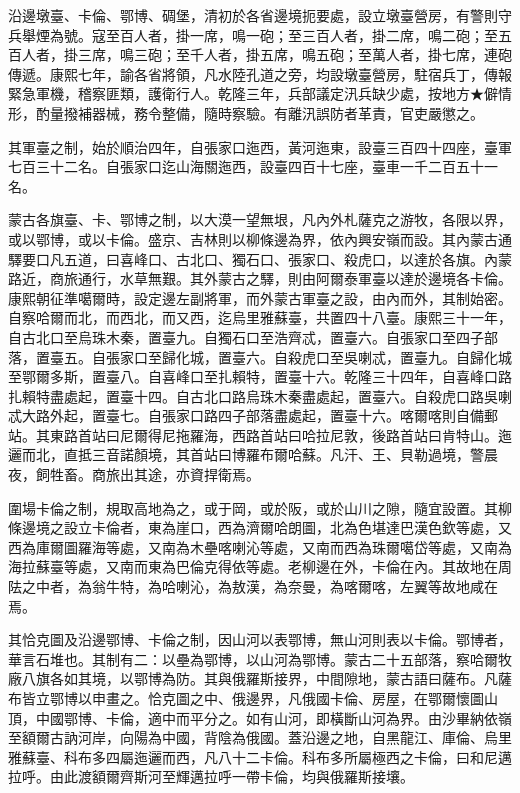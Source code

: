 \begin{pinyinscope}
沿邊墩臺、卡倫、鄂博、碉堡，清初於各省邊境扼要處，設立墩臺營房，有警則守兵舉煙為號。寇至百人者，掛一席，鳴一砲；至三百人者，掛二席，鳴二砲；至五百人者，掛三席，鳴三砲；至千人者，掛五席，鳴五砲；至萬人者，掛七席，連砲傳遞。康熙七年，諭各省將領，凡水陸孔道之旁，均設墩臺營房，駐宿兵丁，傳報緊急軍機，稽察匪類，護衛行人。乾隆三年，兵部議定汛兵缺少處，按地方★僻情形，酌量撥補器械，務令整備，隨時察驗。有離汛誤防者革責，官吏嚴懲之。

其軍臺之制，始於順治四年，自張家口迤西，黃河迤東，設臺三百四十四座，臺軍七百三十二名。自張家口迄山海關迤西，設臺四百十七座，臺車一千二百五十一名。

蒙古各旗臺、卡、鄂博之制，以大漠一望無垠，凡內外札薩克之游牧，各限以界，或以鄂博，或以卡倫。盛京、吉林則以柳條邊為界，依內興安嶺而設。其內蒙古通驛要口凡五道，曰喜峰口、古北口、獨石口、張家口、殺虎口，以達於各旗。內蒙路近，商旅通行，水草無艱。其外蒙古之驛，則由阿爾泰軍臺以達於邊境各卡倫。康熙朝征準噶爾時，設定邊左副將軍，而外蒙古軍臺之設，由內而外，其制始密。自察哈爾而北，而西北，而又西，迄烏里雅蘇臺，共置四十八臺。康熙三十一年，自古北口至烏珠木秦，置臺九。自獨石口至浩齊忒，置臺六。自張家口至四子部落，置臺五。自張家口至歸化城，置臺六。自殺虎口至吳喇忒，置臺九。自歸化城至鄂爾多斯，置臺八。自喜峰口至扎賴特，置臺十六。乾隆三十四年，自喜峰口路扎賴特盡處起，置臺十四。自古北口路烏珠木秦盡處起，置臺六。自殺虎口路吳喇忒大路外起，置臺七。自張家口路四子部落盡處起，置臺十六。喀爾喀則自備郵站。其東路首站曰尼爾得尼拖羅海，西路首站曰哈拉尼敦，後路首站曰肯特山。迤邐而北，直抵三音諾顏境，其首站曰博羅布爾哈蘇。凡汗、王、貝勒過境，警晨夜，飼牲畜。商旅出其途，亦資捍衛焉。

圍場卡倫之制，規取高地為之，或于岡，或於阪，或於山川之隙，隨宜設置。其柳條邊境之設立卡倫者，東為崖口，西為濟爾哈朗圖，北為色堪達巴漢色欽等處，又西為庫爾圖羅海等處，又南為木壘喀喇沁等處，又南而西為珠爾噶岱等處，又南為海拉蘇臺等處，又南而東為巴倫克得依等處。老柳邊在外，卡倫在內。其故地在周阹之中者，為翁牛特，為哈喇沁，為敖漢，為奈曼，為喀爾喀，左翼等故地咸在焉。

其恰克圖及沿邊鄂博、卡倫之制，因山河以表鄂博，無山河則表以卡倫。鄂博者，華言石堆也。其制有二：以壘為鄂博，以山河為鄂博。蒙古二十五部落，察哈爾牧廠八旗各如其境，以鄂博為防。其與俄羅斯接界，中間隙地，蒙古語曰薩布。凡薩布皆立鄂博以申畫之。恰克圖之中、俄邊界，凡俄國卡倫、房屋，在鄂爾懷圖山頂，中國鄂博、卡倫，適中而平分之。如有山河，即橫斷山河為界。由沙畢納依嶺至額爾古訥河岸，向陽為中國，背陰為俄國。蓋沿邊之地，自黑龍江、庫倫、烏里雅蘇臺、科布多四屬迤邐而西，凡八十二卡倫。科布多所屬極西之卡倫，曰和尼邁拉呼。由此渡額爾齊斯河至輝邁拉呼一帶卡倫，均與俄羅斯接壤。


\end{pinyinscope}
